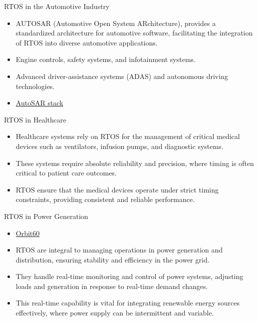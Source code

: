 \documentclass[10pt]{beamer}
\begin{document}
\begin{frame}{RTOS in the Automotive Industry}
    \begin{itemize}
        \item AUTOSAR (Automotive Open System ARchitecture), provides a standardized architecture for automotive software, facilitating the integration of RTOS into diverse automotive applications.
        \item Engine controls, safety systems, and infotainment systems.
        \item Advanced driver-assistance systems (ADAS) and autonomous driving technologies.
        \item \href{https://www.autosar.org/standards/classic-platform}{AutoSAR stack}
    \end{itemize}
\end{frame}

\begin{frame}{RTOS in Healthcare}
    \begin{itemize}
        \item Healthcare systems rely on RTOS for the management of critical medical devices such as ventilators, infusion pumps, and diagnostic systems.
        \item These systems require absolute reliability and precision, where timing is often critical to patient care outcomes.
        \item RTOS ensure that the medical devices operate under strict timing constraints, providing consistent and reliable performance.
    \end{itemize}
\end{frame}

\begin{frame}{RTOS in Power Generation}
    \begin{itemize}
        \item \href{https://www.bakerhughes.com/bently-nevada/monitoring-systems/machinery-protection/orbit-60-series}{Orbit60}
        \item RTOS are integral to managing operations in power generation and distribution, ensuring stability and efficiency in the power grid.
        \item They handle real-time monitoring and control of power systems, adjusting loads and generation in response to real-time demand changes.
        \item This real-time capability is vital for integrating renewable energy sources effectively, where power supply can be intermittent and variable.
    \end{itemize}
\end{frame}
\end{document}
